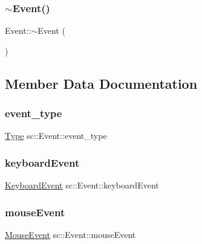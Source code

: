 \mbox{\label{classsc_1_1_event_a7704ec01ce91e673885792054214b3d2}} 
\subsubsection{\texorpdfstring{$\sim$Event()}{~Event()}}
{\footnotesize\ttfamily Event\+::$\sim$\+Event (\begin{DoxyParamCaption}{ }\end{DoxyParamCaption})}



\subsection{Member Data Documentation}
\mbox{\label{classsc_1_1_event_ade0fcce9d293157a80f712eb912ece21}} 
\subsubsection{\texorpdfstring{event\_type}{event\_type}}
{\footnotesize\ttfamily \mbox{\hyperlink{classsc_1_1_event_a2aeb7e82d52a083b626e7baf3f81cc8a}{Type}} sc\+::\+Event\+::event\+\_\+type}

\mbox{\label{classsc_1_1_event_a8f5b5d2cc9e63a71009ca58613e9929a}} 
\subsubsection{\texorpdfstring{keyboardEvent}{keyboardEvent}}
{\footnotesize\ttfamily \mbox{\hyperlink{classsc_1_1_keyboard_event}{Keyboard\+Event}} sc\+::\+Event\+::keyboard\+Event}

\mbox{\label{classsc_1_1_event_ae7f6b1807c791e255f66007a5ae1eb2b}} 
\subsubsection{\texorpdfstring{mouseEvent}{mouseEvent}}
{\footnotesize\ttfamily \mbox{\hyperlink{classsc_1_1_mouse_event}{Mouse\+Event}} sc\+::\+Event\+::mouse\+Event}



